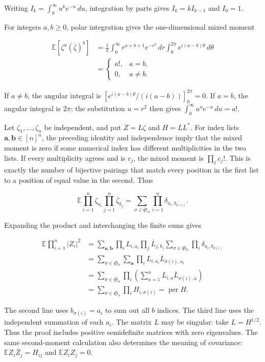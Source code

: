 \documentclass[11pt,a4paper]{article}
\begin{document}
Writing \(I_k=\int_0^\infty u^ke^{-u}\,du\), integration by parts gives \(I_k=kI_{k-1}\) and \(I_0=1\).

For integers \(a,b\ge0\), polar integration gives the one-dimensional mixed moment

\[
\begin{aligned}
\mathbb E[\zeta^a(\overline\zeta)^b]
&=\frac1\pi\int_0^\infty r^{a+b+1}e^{-r^2}\,dr
\int_0^{2\pi}e^{i(a-b)\theta}\,d\theta\\
&=\begin{cases}a!,&a=b,\\0,&a\ne b.\end{cases}
\end{aligned}
\]

If \(a\ne b\), the angular integral is \([e^{i(a-b)\theta}/(i(a-b))]_0^{2\pi}=0\). If \(a=b\), the angular integral is \(2\pi\); the substitution \(u=r^2\) then gives \(\int_0^\infty u^ae^{-u}\,du=a!\).

Let \(\zeta_1,\ldots,\zeta_n\) be independent, and put \(Z=L\zeta\) and \(H=LL^*\). For index lists \(\boldsymbol a,\boldsymbol b\in[n]^n\), the preceding identity and independence imply that the mixed moment is zero if some numerical index has different multiplicities in the two lists. If every multiplicity agrees and is \(c_j\), the mixed moment is \(\prod_jc_j!\). This is exactly the number of bijective pairings that match every position in the first list to a position of equal value in the second. Thus

\[
\mathbb E\prod_{i=1}^n\zeta_{a_i}\prod_{j=1}^n\overline\zeta_{b_j}
=\sum_{\sigma\in \mathfrak S_n}\prod_{i=1}^n\delta_{a_i,b_{\sigma(i)}}.
\]

Expanding the product and interchanging the finite sums gives

\[
\begin{aligned}
\mathbb E\prod_{i=1}^n|Z_i|^2
&=\sum_{\boldsymbol a,\boldsymbol b}
\prod_iL_{i,a_i}\prod_j\overline L_{j,b_j}
\sum_{\sigma\in \mathfrak S_n}\prod_i\delta_{a_i,b_{\sigma(i)}}\\
&=\sum_{\sigma\in \mathfrak S_n}\sum_{\boldsymbol a}
\prod_i L_{i,a_i}\overline L_{\sigma(i),a_i}\\
&=\sum_{\sigma\in \mathfrak S_n}\prod_i
\left(\sum_{a=1}^nL_{i,a}\overline L_{\sigma(i),a}\right)\\
&=\sum_{\sigma\in \mathfrak S_n}\prod_iH_{i,\sigma(i)}
=\operatorname{per}H.
\end{aligned}
\]

The second line uses \(b_{\sigma(i)}=a_i\) to sum out all \(b\) indices. The third line uses the independent summation of each \(a_i\). The matrix \(L\) may be singular: take \(L=H^{1/2}\). Thus the proof includes positive semidefinite matrices with zero eigenvalues. The same second-moment calculation also determines the meaning of covariance: \(\mathbb EZ_i\overline Z_j=H_{ij}\) and \(\mathbb EZ_iZ_j=0\).
\end{document}
